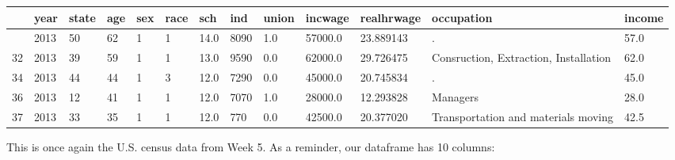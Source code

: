 \documentclass[
  letterpaper,
  DIV=11,
  numbers=noendperiod]{scrreprt}
\begin{document}
\begin{longtable}[]{@{}lllllllllllll@{}}
\toprule\noalign{}
& year & state & age & sex & race & sch & ind & union & incwage &
realhrwage & occupation & income \\
\midrule\noalign{}
\endhead
\bottomrule\noalign{}
\endlastfoot
20 & 2013 & 50 & 62 & 1 & 1 & 14.0 & 8090 & 1.0 & 57000.0 & 23.889143 &
. & 57.0 \\
32 & 2013 & 39 & 59 & 1 & 1 & 13.0 & 9590 & 0.0 & 62000.0 & 29.726475 &
Consruction, Extraction, Installation & 62.0 \\
34 & 2013 & 44 & 44 & 1 & 3 & 12.0 & 7290 & 0.0 & 45000.0 & 20.745834 &
. & 45.0 \\
36 & 2013 & 12 & 41 & 1 & 1 & 12.0 & 7070 & 1.0 & 28000.0 & 12.293828 &
Managers & 28.0 \\
37 & 2013 & 33 & 35 & 1 & 1 & 12.0 & 770 & 0.0 & 42500.0 & 20.377020 &
Transportation and materials moving & 42.5 \\
\end{longtable}

This is once again the U.S. census data from Week 5. As a reminder, our
dataframe has 10 columns:
\end{document}
